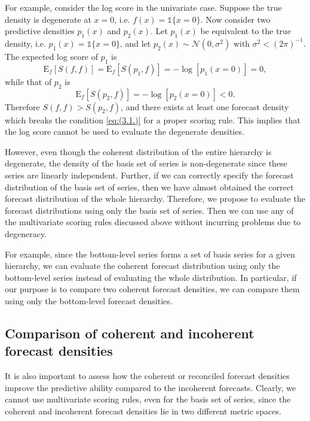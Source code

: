 \documentclass[a4paper, 11pt]{article}
\def\E{\text{E}}
\begin{document}
For example, consider the log score in the univariate case. Suppose the true density is degenerate at $x=0$, i.e. $f(x)=\mathbb{1}\{x=0\}$.   Now consider two predictive densities $p_1(x)$ and $p_2(x)$. Let $p_1(x)$ be equivalent to the true density, i.e. $p_1(x)=\mathbb{1}\{x=0\}$, and let $p_2(x) \sim \mathcal{N}(0,\sigma^2)$ with $\sigma^2 < (2\pi)^{-1}$. The expected log score of $p_1$ is
$$
\E_f[S(f,f)] = \E_f[S(p_1,f)] = -\log[p_1(x=0)]=0,
$$
while that of $p_2$ is
$$
\E_f[S(p_2,f)] = -\log[p_2(x=0)]<0.
$$
Therefore $S(f,f) > S(p_2,f)$, and there exists at least one forecast density which breaks the condition \eqref{eq:(3.1.)} for a proper scoring rule. This implies that the log score cannot be used to evaluate the degenerate densities.

However, even though the coherent distribution of the entire hierarchy is degenerate, the density of the basis set of series is non-degenerate since these series are linearly independent. Further, if we can correctly specify the forecast distribution of the basis set of series, then we have almost obtained the correct forecast distribution of the whole hierarchy. Therefore, we propose to evaluate the forecast distributions using only the basis set of series. Then we can use any of the multivariate scoring rules discussed above without incurring problems due to degeneracy.

For example, since the bottom-level series forms a set of basis series for a given hierarchy, we can evaluate the coherent forecast distribution using only the bottom-level series instead of evaluating the whole distribution. In particular, if our purpose is to compare two coherent forecast densities, we can compare them using only the bottom-level forecast densities.

\subsection{Comparison of coherent and incoherent forecast densities}

It is also important to assess how the coherent or reconciled forecast densities improve the predictive ability compared to the incoherent forecasts. Clearly, we cannot use multivariate scoring rules, even for the basis set of series, since the coherent and incoherent forecast densities lie in two different metric spaces.
\end{document}
